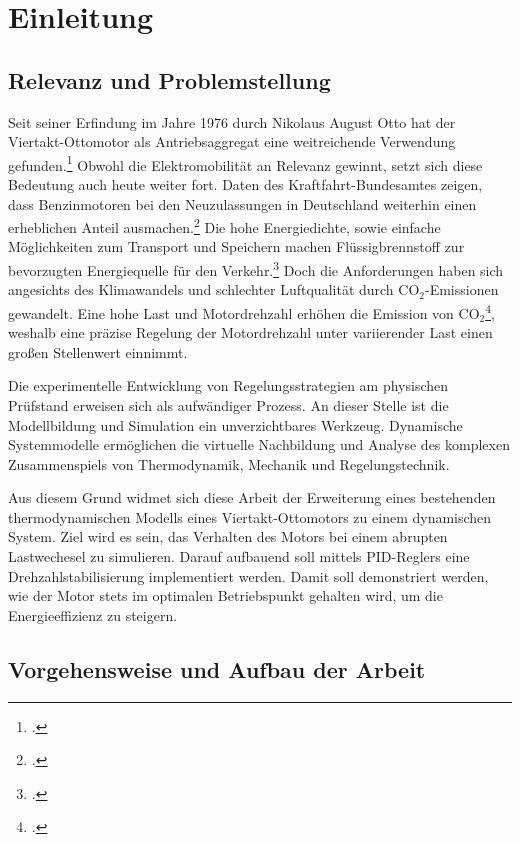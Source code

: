 \section{Einleitung}

\subsection{Relevanz und Problemstellung}
Seit seiner Erfindung im Jahre 1976 durch Nikolaus August Otto hat der Viertakt-Ottomotor als Antriebsaggregat eine weitreichende Verwendung gefunden.\footcite[Vgl.][1]{merker2019} 
Obwohl die Elektromobilität an Relevanz gewinnt, setzt sich diese Bedeutung auch heute weiter fort.
Daten des Kraftfahrt-Bundesamtes zeigen, dass Benzinmotoren bei den Neuzulassungen in Deutschland weiterhin einen erheblichen Anteil ausmachen.\footcite[Vgl.][]{kba2025}
Die hohe Energiedichte, sowie einfache Möglichkeiten zum Transport und Speichern machen Flüssigbrennstoff zur bevorzugten Energiequelle für den Verkehr.\footcite[Vgl.][2]{leach2020}
Doch die Anforderungen haben sich angesichts des Klimawandels und schlechter Luftqualität durch $\text{CO}_2$-Emissionen gewandelt.
Eine hohe Last und Motordrehzahl erhöhen die Emission von $\text{CO}_2$\footcite[Vgl.][6]{shahad2015}, weshalb eine präzise Regelung der Motordrehzahl unter variierender Last einen großen Stellenwert einnimmt.

Die experimentelle Entwicklung von Regelungsstrategien am physischen Prüfstand erweisen sich als aufwändiger Prozess.
An dieser Stelle ist die Modellbildung und Simulation ein unverzichtbares Werkzeug.
Dynamische Systemmodelle ermöglichen die virtuelle Nachbildung und Analyse des komplexen Zusammenspiels von Thermodynamik, Mechanik und Regelungstechnik.

Aus diesem Grund widmet sich diese Arbeit der Erweiterung eines bestehenden thermodynamischen Modells eines Viertakt-Ottomotors zu einem dynamischen System.
Ziel wird es sein, das Verhalten des Motors bei einem abrupten Lastwechesel zu simulieren.
Darauf aufbauend soll mittels PID-Reglers eine Drehzahlstabilisierung implementiert werden.
Damit soll demonstriert werden, wie der Motor stets im optimalen Betriebspunkt gehalten wird, um die Energieeffizienz zu steigern.

\subsection{Vorgehensweise und Aufbau der Arbeit}

